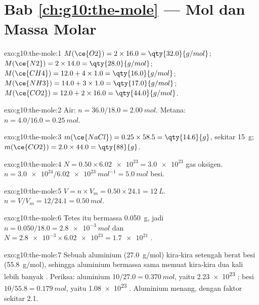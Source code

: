 \section*{Bab \ref{ch:g10:the-mole} --- Mol dan Massa Molar}

\begin{solution}{exo:g10:the-mole:1}
$M(\ce{O2}) = 2 \times 16.0 = \qty{32.0}{g/mol}$;
$M(\ce{N2}) = 2 \times 14.0 = \qty{28.0}{g/mol}$;
$M(\ce{CH4}) = 12.0 + 4 \times 1.0 = \qty{16.0}{g/mol}$;
$M(\ce{NH3}) = 14.0 + 3 \times 1.0 = \qty{17.0}{g/mol}$;
$M(\ce{CO2}) = 12.0 + 2 \times 16.0 = \qty{44.0}{g/mol}$.
\end{solution}

\begin{solution}{exo:g10:the-mole:2}
Air: $n = 36.0 / 18.0 = \qty{2.00}{mol}$. Metana:
$n = 4.0 / 16.0 = \qty{0.25}{mol}$.
\end{solution}

\begin{solution}{exo:g10:the-mole:3}
$m(\ce{NaCl}) = 0.25 \times 58.5 = \qty{14.6}{g}$, sekitar \qty{15}{g};
$m(\ce{CO2}) = 2.0 \times 44.0 = \qty{88}{g}$.
\end{solution}

\begin{solution}{exo:g10:the-mole:4}
$N = 0.50 \times \num{6.02e23} = \num{3.0e23}$  gas oksigen.
$n = \num{3.0e24} / \qty{6.02e23}{mol^{-1}} = \qty{5.0}{mol}$ besi.
\end{solution}

\begin{solution}{exo:g10:the-mole:5}
$V = n \times V_m = 0.50 \times 24.1 = \qty{12}{L}$.
$n = V / V_m = 12 / 24.1 = \qty{0.50}{mol}$.
\end{solution}

\begin{solution}{exo:g10:the-mole:6}
Tetes itu bermassa \qty{0.050}{g}, jadi
$n = 0.050 / 18.0 = \qty{2.8e-3}{mol}$ dan
$N = \num{2.8e-3} \times \num{6.02e23} = \num{1.7e21}$ .
\end{solution}

\begin{solution}{exo:g10:the-mole:7}
Sebuah  aluminium (\qty{27.0}{g/mol}) kira-kira setengah berat 
besi (\qty{55.8}{g/mol}), sehingga aluminium bermassa sama memuat
kira-kira dua kali lebih banyak . Periksa: aluminium
$10/27.0 = \qty{0.370}{mol}$, yaitu \num{2.23e23} ; besi
$10/55.8 = \qty{0.179}{mol}$, yaitu \num{1.08e23} . Aluminium
menang, dengan faktor sekitar 2.1.
\end{solution}

